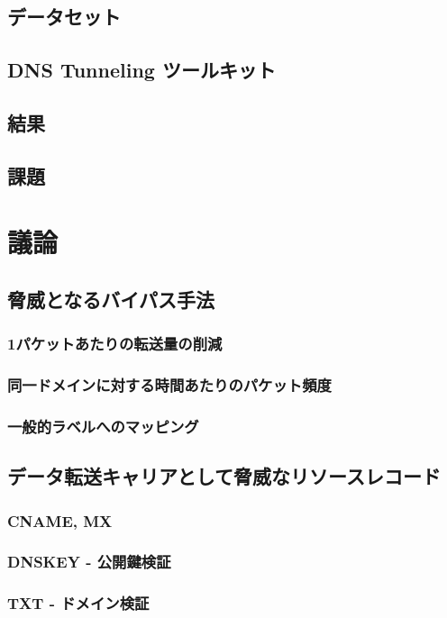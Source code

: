 \documentclass[12pt]{jarticle} %
\begin{document}
\subsection{データセット}
\subsection{DNS Tunneling ツールキット}
\subsection{結果}
\subsection{課題}

\newpage
\section{議論}
\subsection{脅威となるバイパス手法}
\subsubsection{1パケットあたりの転送量の削減}
\subsubsection{同一ドメインに対する時間あたりのパケット頻度}
\subsubsection{一般的ラベルへのマッピング}
\subsection{データ転送キャリアとして脅威なリソースレコード}
\subsubsection{CNAME, MX}
\subsubsection{DNSKEY - 公開鍵検証}
\subsubsection{TXT - ドメイン検証}
\end{document}
